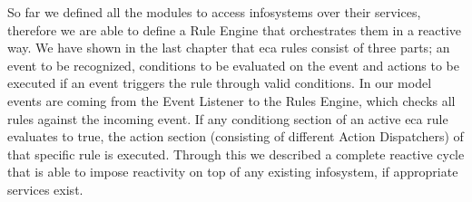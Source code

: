 So far we defined all the modules to access \textrm{\glspl{infosystem}} over their services, therefore we are able to define a \textrm{Rule Engine} that orchestrates them in a reactive way.
We have shown in the last chapter that \textrm{\acrshort{eca}} rules consist of three parts; an event to be recognized, conditions to be evaluated on the event and actions to be executed if an event triggers the rule through valid conditions.
In our model events are coming from the \textrm{Event Listener} to the \textrm{Rules Engine}, which checks all rules against the incoming event.
If any conditiong section of an active \textrm{\acrshort{eca}} rule evaluates to true, the action section (consisting of different \textrm{Action Dispatchers}) of that specific rule is executed.
Through this we described a complete reactive cycle that is able to impose reactivity on top of any existing \textrm{\gls{infosystem}}, if appropriate services exist.
